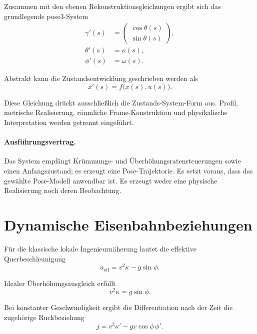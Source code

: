 Zusammen mit den ebenen Rekonstruktionsgleichungen ergibt sich das
grundlegende pose3-System
\begin{equation}
\begin{aligned}
\gamma'(s)
&=
\begin{pmatrix}
\cos\theta(s)\\
\sin\theta(s)
\end{pmatrix},\\
\theta'(s)&=\kappa(s),\\
\phi'(s)&=\omega(s).
\end{aligned}
\label{eq:pose3-system}
\end{equation}

Abstrakt kann die Zustandsentwicklung geschrieben werden als
\begin{equation}
x'(s)=f\bigl(x(s),u(s)\bigr).
\label{eq:general-state-system}
\end{equation}

Diese Gleichung drückt ausschließlich die Zustands-System-Form aus. Profil,
metrische Realisierung, räumliche Frame-Konstruktion und physikalische
Interpretation werden getrennt eingeführt.

\paragraph{Ausführungsvertrag.}
Das System empfängt Krümmungs- und Überhöhungsratensteuerungen sowie einen
Anfangszustand; es erzeugt eine Pose-Trajektorie. Es setzt voraus, dass das
gewählte Pose-Modell anwendbar ist. Es erzeugt weder eine physische
Realisierung noch deren Beobachtung.

\section{Dynamische Eisenbahnbeziehungen}

Für die klassische lokale Ingenieurnäherung lautet die effektive
Querbeschleunigung
\begin{equation}
a_{\mathrm{eff}}
=
v^2\kappa-g\sin\phi.
\label{eq:effective-lateral-acceleration}
\end{equation}

Idealer Überhöhungsausgleich erfüllt
\begin{equation}
v^2\kappa=g\sin\phi.
\label{eq:cant-equilibrium}
\end{equation}

Bei konstanter Geschwindigkeit ergibt die Differentiation nach der Zeit die
zugehörige Ruckbeziehung
\begin{equation}
j
=
v^3\kappa'
-gv\cos\phi\,\phi'.
\label{eq:jerk-relation}
\end{equation}

